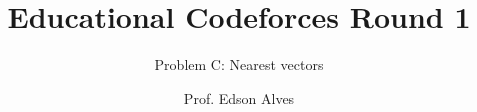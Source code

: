 \title{Educational Codeforces Round 1}
\subtitle{Problem C: Nearest vectors}
\date{}
\author{Prof. Edson Alves}
